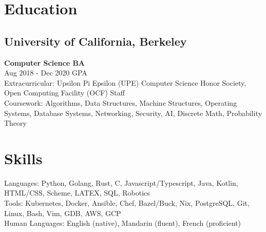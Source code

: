 \documentclass{article}
\newcommand{\entry}[3]{\quad\textbf{#1}\\#2\qquad#3}
\begin{document}
\section{Education}
\subsection{University of California, Berkeley}
\entry{Computer Science BA}{Aug 2018 - Dec 2020}{3.84 GPA}\\
Extracurricular:
  Upsilon Pi Epsilon (UPE) Computer Science Honor Society,
  Open Computing Facility (OCF) Staff\\
Coursework:
  Algorithms,
  Data Structures,
  Machine Structures,
  Operating Systems,
  Database Systems,
  Networking,
  Security,
  AI, Discrete Math,
  Probability Theory


\section{Skills}
Languages:
  Python, Golang, Rust, C, Javascript/Typescript, Java, Kotlin, HTML/CSS,
  Scheme, LATEX, SQL, Robotics \\
Tools:
  Kubernetes, Docker, Ansible, Chef, Bazel/Buck, Nix, PostgreSQL, Git, Linux,
  Bash, Vim, GDB, AWS, GCP \\
Human Languages:
  English (native), Mandarin (fluent), French (proficient)
\end{document}
